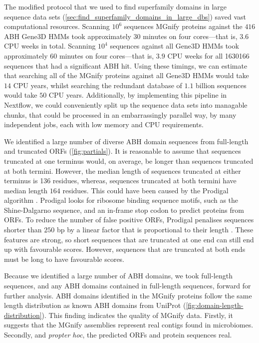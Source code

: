 The modified protocol that we used to find superfamily domains in large sequence data sets (\ref{sec:find_superfamily_domains_in_large_dbs}) saved vast computational resources. Scanning $10^6$ sequences MGnify proteins against the $416$ ABH Gene$3$D HMMs took approximately $30$ minutes on four cores---that is, $3.6$ CPU weeks in total. Scanning $10^4$ sequences against all Gene$3$D HMMs took approximately $60$ minutes on four cores---that is, $3.9$ CPU weeks for all \num{1630166} sequences that had a significant ABH hit.
Using these timings, we can estimate that searching all of the MGnify proteins against all Gene$3$D HMMs would take $14$ CPU years, whilst searching the redundant database of $1.1$ billion sequences would take $50$ CPU years. Additionally, by implementing this pipeline in Nextflow, we could conveniently split up the sequence data sets into managable chunks, that could be processed in an embarrassingly parallel way, by many independent jobs, each with low memory and CPU requirements.

We identified a large number of diverse ABH domain sequences from full-length and truncated ORFs (\ref{fig:partials}). It is reasonable to assume that sequences truncated at one terminus would, on average, be longer than sequences truncated at both termini. However, the median length of sequences truncated at either terminus is 136 residues, whereas, sequences truncated at both termini have median length $164$ residues. This could have been caused by the Prodigal algorithm \cite{Hyatt2010}. Prodigal looks for ribosome binding sequence motifs, such as the Shine-Dalgarno sequence, and an in-frame stop codon to predict proteins from ORFs. To reduce the number of false positive ORFs, Prodigal penalises sequences shorter than $250$ bp by a linear factor that is proportional to their length \cite{Hyatt2010}. These features are strong, so short sequences that are truncated at one end can still end up with favourable scores. However, sequences that are truncated at both ends must be long to have favourable scores.

Because we identified a large number of ABH domains, we took full-length sequences, and any ABH domains contained in full-length sequences, forward for further analysis. ABH domains identified in the MGnify proteins follow the same length distribution as known ABH domains from UniProt (\ref{fig:domain-length-distribution}). This finding indicates the quality of MGnify data. Firstly, it suggests that the MGnify assemblies represent real contigs found in microbiomes. Secondly, and \emph{propter hoc}, the predicted ORFs and protein sequences real.

